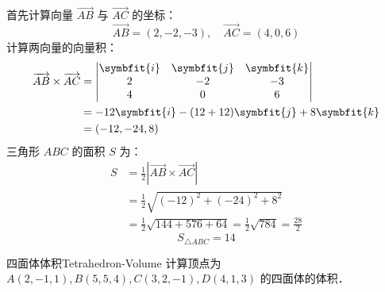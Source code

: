 \begin{solution}
    首先计算向量 $\overrightarrow{AB}$ 与 $\overrightarrow{AC}$ 的坐标：
    \begin{equation}
        \overrightarrow{AB} = (2, -2, -3), \quad \overrightarrow{AC} = (4, 0, 6)
    \end{equation}
    计算两向量的向量积：
    \begin{equation}
        \begin{aligned}
            \overrightarrow{AB} \times \overrightarrow{AC} & = \begin{vmatrix} \symbfit{i} & \symbfit{j} & \symbfit{k} \\ 2 & -2 & -3 \\ 4 & 0 & 6 \end{vmatrix} \\
                                                           & = -12\symbfit{i} - (12 + 12)\symbfit{j} + 8\symbfit{k}                                              \\
                                                           & = (-12, -24, 8)
        \end{aligned}
    \end{equation}
    三角形 $ABC$ 的面积 $S$ 为：
    \begin{equation}
        \begin{aligned}
            S & = \frac{1}{2} \left| \overrightarrow{AB} \times \overrightarrow{AC} \right| \\
              & = \frac{1}{2} \sqrt{(-12)^2 + (-24)^2 + 8^2}                                \\
              & = \frac{1}{2} \sqrt{144 + 576 + 64} = \frac{1}{2} \sqrt{784} = \frac{28}{2}
        \end{aligned}
    \end{equation}
    \begin{equation}
        \boxed{S_{\triangle ABC} = 14}
    \end{equation}
\end{solution}

\begin{problem}{四面体体积}{Tetrahedron-Volume}
    计算顶点为 $A(2, -1, 1), B(5, 5, 4), C(3, 2, -1), D(4, 1, 3)$ 的四面体的体积．
\end{problem}

